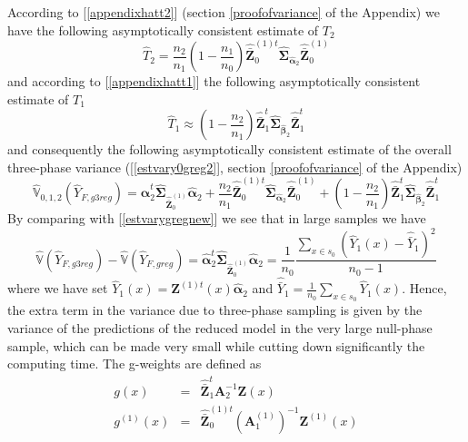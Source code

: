 \documentclass[a4paper,12pt,leqno, titlepage]{article}
\newcommand{\VAR}{\mathbb{V}}
\begin{document}
According to [\ref{appendixhatt2}] (section \ref{proofofvariance} of the Appendix) we have the following asymptotically consistent estimate of $T_2$
\begin{equation}\label{hatt2}
\hat{T}_2=\frac{n_2}{n_1}(1-\frac{n_1}{n_0})\hat{\bar{\pmb{Z}}}^{(1)t}_0
\hat{\pmb{\Sigma}}_{\hat{\pmb{\alpha}}_{2}}\hat{\bar{\pmb{Z}}}^{(1)}_0
\end{equation}
\noindent and according to [\ref{appendixhatt1}] the following asymptotically consistent estimate of $T_1$
\begin{equation}\label{hatt1}
\hat{T}_1 \approx (1-\frac{n_2}{n_1})\hat{\bar{\pmb{Z}}}^{t}_1\hat{\pmb{\Sigma}}_{\hat{\pmb{\beta}}_2}\hat{\bar{\pmb{Z}}}^{t}_1
\end{equation}
and consequently the following asymptotically consistent estimate of the overall three-phase variance ([\ref{estvary0greg2}], section \ref{proofofvariance} of the Appendix)
\begin{equation}\label{estvarianceY0greg}
\hat{\VAR}_{0,1,2}(\hat{Y}_{F,g3reg})=\hat{\pmb{\alpha}}_2^t\hat{\pmb{\Sigma}}_{\hat{\bar{\pmb{Z}}}^{(1)}_0}\hat{\pmb{\alpha}}_2
+\frac{n_2}{n_1}\hat{\bar{\pmb{Z}}}^{(1)t}_0
\hat{\pmb{\Sigma}}_{\hat{\pmb{\alpha}}_{2}}\hat{\bar{\pmb{Z}}}^{(1)}_0 + (1-\frac{n_2}{n_1})\hat{\bar{\pmb{Z}}}^{t}_1\hat{\pmb{\Sigma}}_{\hat{\pmb{\beta}}_2}\hat{\bar{\pmb{Z}}}^{t}_1
\end{equation}
\noindent By comparing with [\ref{estvarygregnew}] we see that in large samples we have
\begin{equation}\label{comparison1}
\hat{\VAR}(\hat{Y}_{F,g3reg})- \hat{\VAR}(\hat{Y}_{F,greg})=
\hat{\pmb{\alpha}}_2^t\hat{\pmb{\Sigma}}_{\hat{\bar{\pmb{Z}}}^{(1)}_0}\hat{\pmb{\alpha}}_2
=\frac{1}{n_0}\frac{\sum_{x\in{s_0}}(\hat{Y}_1(x)-\hat{\bar{Y}}_1)^2}{n_0-1}
\end{equation}
\noindent where we have set $\hat{Y}_1(x)=\pmb{Z}^{(1)t}(x)\hat{\pmb{\alpha}}_2$ and
$\hat{\bar{Y}}_1=\frac{1}{n_0}\sum_{x\in{s_0}}\hat{Y}_1(x)$. Hence, the extra term in the variance due to three-phase sampling is given by the variance of the predictions of the reduced model in the very large null-phase sample, which can be made very small while cutting down significantly the computing time.
The g-weights are defined as
\begin{eqnarray}\label{gweight1}
g(x) &=& \hat{\bar{\pmb{Z}}}_1^t\pmb{A}_2^{-1}\pmb{Z}(x)\nonumber \\
g^{(1)}(x) &=& \hat{\bar{\pmb{Z}}}_0^{(1)t}(\pmb{A}^{(1)}_1)^{-1}\pmb{Z}^{(1)}(x)
\end{eqnarray}
\end{document}
